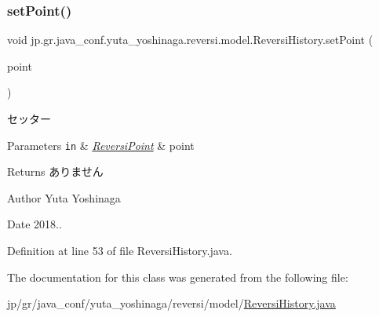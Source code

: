\subsubsection{\texorpdfstring{set\+Point()}{setPoint()}}
{\footnotesize\ttfamily void jp.\+gr.\+java\+\_\+conf.\+yuta\+\_\+yoshinaga.\+reversi.\+model.\+Reversi\+History.\+set\+Point (\begin{DoxyParamCaption}\item[{\hyperlink{classjp_1_1gr_1_1java__conf_1_1yuta__yoshinaga_1_1reversi_1_1model_1_1_reversi_point}{Reversi\+Point}}]{point }\end{DoxyParamCaption})}



セッター 


\begin{DoxyParams}[1]{Parameters}
\mbox{\tt in}  & {\em \hyperlink{classjp_1_1gr_1_1java__conf_1_1yuta__yoshinaga_1_1reversi_1_1model_1_1_reversi_point}{Reversi\+Point}} & point \\
\hline
\end{DoxyParams}
\begin{DoxyReturn}{Returns}
ありません 
\end{DoxyReturn}
\begin{DoxyAuthor}{Author}
Yuta Yoshinaga 
\end{DoxyAuthor}
\begin{DoxyDate}{Date}
2018.. 
\end{DoxyDate}


Definition at line 53 of file Reversi\+History.\+java.



The documentation for this class was generated from the following file\+:\begin{DoxyCompactItemize}
\item 
jp/gr/java\+\_\+conf/yuta\+\_\+yoshinaga/reversi/model/\hyperlink{_reversi_history_8java}{Reversi\+History.\+java}\end{DoxyCompactItemize}
